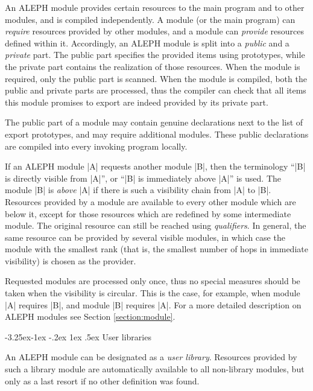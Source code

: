 \documentclass[titlepage]{article}
\makeatletter
\newcommand\A{\textsf{ALEPH}}
\renewcommand\subsection{%
\@startsection{subsection}{2}{\z@}%
   {-3.25ex\@plus -1ex \@minus -.2ex}%
   {1ex \@plus .5ex}%
   {\normalfont\normalsize\bfseries}}
\makeatother
\begin{document}
An \A{} module provides certain resources to the main program and to other
modules, and is compiled independently. A module (or the main program)
can \emph{require} resources provided by other modules, and a module can
\emph{provide} resources defined within it. Accordingly, an \A{} module is
split into a \emph{public} and a \emph{private} part. The public part
specifies the provided items using prototypes, while the private part
contains the realization of those resources. When the module is required,
only the public part is scanned. When the module is compiled, both the
public and private parts are processed, thus the compiler can check that all
items this module promises to export are indeed provided by its private
part.

The public part of a module may contain genuine declarations next to the
list of export prototypes, and may require additional modules. These public
declarations are compiled into every invoking program locally.

If an \A{} module \pp|A| requests another module \pp|B|,
then the terminology ``\pp|B| is directly visible from \pp|A|'', or
``\pp|B| is immediately above \pp|A|'' is used. The module \pp|B|
is \emph{above} \pp|A| if there is such a visibility chain from \pp|A|
to \pp|B|. Resources provided by a module are available to every other
module which are below it, except for those resources which are redefined by
some intermediate module. The original resource can still be reached using
\emph{qualifiers}. In general, the same resource can be provided by several
visible modules, in which case the module with the smallest rank (that is,
the smallest number of hops in immediate visibility) is chosen as the
provider.

Requested modules are processed only once, thus no special measures should be
taken when the visibility is circular. This is the case, for example, when
module \pp|A| requires \pp|B|, and module \pp|B| requires
\pp|A|. For a more detailed description on \A{} modules see Section
\ref{section:module}.
 
\subsection{User libraries}\label{subsec:user-library}

An \A{} module can be designated as a \emph{user library}. Resources
provided by such a library module are automatically available to all
non-library modules,
but only as a last resort if no other definition was found.
\end{document}
